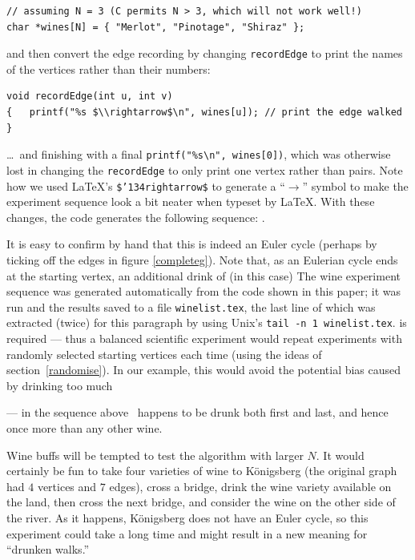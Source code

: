 \documentclass[12pt]{article}
\begin{document}
\begin{verbatim}
// assuming N = 3 (C permits N > 3, which will not work well!)
char *wines[N] = { "Merlot", "Pinotage", "Shiraz" }; 
\end{verbatim}

and then convert the edge recording by changing \texttt{recordEdge} to print the names of the vertices rather than their numbers: 

\begin{Verbatim}
void recordEdge(int u, int v) 
{   printf("%s $\\rightarrow$\n", wines[u]); // print the edge walked
}
\end{Verbatim}

\label{winelist}
\ldots\ and finishing with a final \verb|printf("%s\n", wines[0])|, which was otherwise lost in changing the \verb|recordEdge| to only print one vertex rather than pairs. Note how we used \LaTeX's \texttt{\$\char'134rightarrow\$} to generate a ``$\rightarrow$'' symbol to make the experiment sequence look a bit neater when typeset by \LaTeX\@. With these changes, the code generates the following sequence: \unskip.

It is easy to confirm by hand that this is indeed an Euler cycle (perhaps by ticking off the edges in figure \ref{completeg}). Note that, as an Eulerian cycle ends at the starting vertex, an additional drink of (in this case) %
{The wine experiment sequence was generated automatically from the code shown in this paper; it was run and the results saved to a file \texttt{winelist.tex}, the last line of which was extracted (twice) for this paragraph by using Unix's \texttt{tail -n 1 winelist.tex}.} is required --- thus a balanced scientific experiment would repeat experiments with randomly selected starting vertices each time (using the ideas of section~\ref{randomise}). In our example, this would avoid the potential bias caused by drinking too much 
 
--- in the sequence above 
\unskip\ 
happens to be drunk both first and last, and hence once more than any other wine.


Wine buffs will be tempted to test the algorithm with larger $N$\@. It would certainly be fun to take four varieties of wine to K\"onigsberg (the original graph had $4$ vertices and $7$ edges), cross a bridge, drink the wine variety available on the land, then cross the next bridge, and consider the wine on the other side of the river. As it happens, K\"onigsberg does not have an Euler cycle, so this experiment could take a long time and might result in a new meaning for ``drunken walks.''
\end{document}

